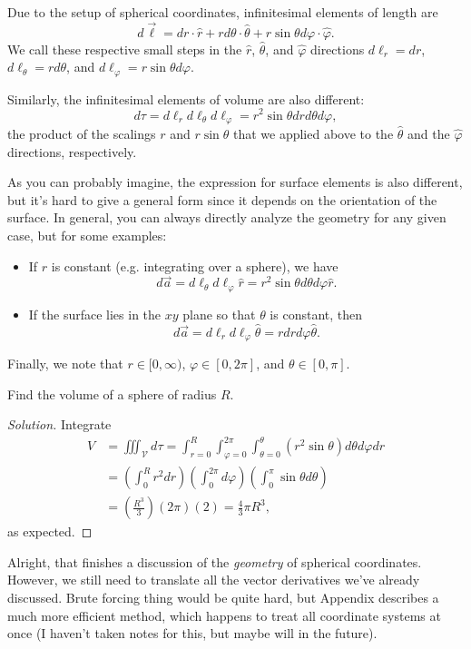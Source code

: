 Due to the setup of spherical coordinates, infinitesimal elements of length are
\[d\vec{\ell}=dr\cdot \hat{r}+rd\theta\cdot \hat{\theta}+r\sin\theta d\varphi\cdot \hat{\varphi}.\]
We call these respective small steps in the $\hat{r}$, $\hat{\theta}$, and $\hat{\varphi}$ directions $d\ell_r=dr$, $d\ell_\theta=rd\theta$, and $d\ell_\varphi=r\sin\theta d\varphi$. 

Similarly, the infinitesimal elements of volume are also different:
\[d\tau=d\ell_r d\ell_\theta d\ell_{\varphi}=r^2\sin\theta drd\theta d\varphi,\]
the product of the scalings $r$ and $r\sin\theta$ that we applied above to the $\hat{\theta}$ and the $\hat{\varphi}$ directions, respectively.

As you can probably imagine, the expression for surface elements is also different, but it's hard to give a general form since it depends on the orientation of the surface. In general, you can always directly analyze the geometry for any given case, but for some examples:
\begin{itemize}
    \item If $r$ is constant (e.g. integrating over a sphere), we have
    \[d\vec{a}=d\ell_\theta d\ell_\varphi\hat{r}=r^2\sin\theta d\theta d\varphi\hat{r}.\]
    \item If the surface lies in the $xy$ plane so that $\theta$ is constant, then
    \[d\vec{a}=d\ell_r d\ell_\varphi\hat{\theta}=rdrd\varphi\hat{\theta}.\]
\end{itemize}
Finally, we note that $r\in [0,\infty)$, $\varphi\in[0,2\pi]$, and $\theta\in[0,\pi]$.

\begin{example}
Find the volume of a sphere of radius $R$.
\end{example}

\begin{proof}[Solution]
Integrate
\begin{align*}
    V&=\iiint_{\mathcal{V}}d\tau=\int_{r=0}^R\int_{\varphi=0}^{2\pi}\int_{\theta=0}^\theta (r^2\sin\theta) d\theta d\varphi dr\\
    &=\left(\int_{0}^R r^2 dr\right)\left(\int_0^{2\pi} d\varphi\right)\left(\int_0^{\pi}\sin\theta d\theta\right)\\
    &=\left(\frac{R^3}{3}\right)(2\pi)(2)=\frac{4}{3}\pi R^3,
\end{align*}
as expected.
\end{proof}

Alright, that finishes a discussion of the \textit{geometry} of spherical coordinates. However, we still need to translate all the vector derivatives we've already discussed. Brute forcing thing would be quite hard, but Appendix describes a much more efficient method, which happens to treat all coordinate systems at once (I haven't taken notes for this, but maybe will in the future).

